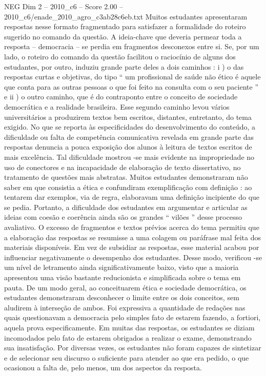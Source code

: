 \begin{textsample}{NEG Dim 2 – 2010\_c6 – Score 2.00 – 2010\_c6/enade\_2010\_agro\_c3ab28c6eb.txt}
Muitos estudantes apresentaram respostas nesse formato fragmentado para satisfazer a formalidade do roteiro sugerido no comando da questão.
A ideia-chave que deveria permear toda a resposta – democracia – se perdia em fragmentos desconexos entre si.
Se, por um lado, o roteiro do comando da questão facilitou o raciocínio de alguns dos estudantes, por outro, induziu grande parte deles a dois caminhos : i ) o das respostas curtas e objetivas, do tipo “ um profissional de saúde não ético é aquele que conta para as outras pessoas o que foi feito na consulta com o seu paciente ” e ii ) o outro caminho, que é do contraponto entre o conceito de sociedade democrática e a realidade brasileira.
Esse segundo caminho levou vários universitários a produzirem textos bem escritos, distantes, entretanto, do tema exigido.
No que se reporta às especificidades do desenvolvimento do conteúdo, a dificuldade ou falta de competência comunicativa revelada em grande parte das respostas denuncia a pouca exposição dos alunos à leitura de textos escritos de mais excelência.
Tal dificuldade mostrou -se mais evidente na impropriedade no uso de conectores e na incapacidade de elaboração de texto dissertativo, no tratamento de questões mais abstratas.
Muitos estudantes demonstraram não saber em que consistia a ética e confundiram exemplificação com definição : ao tentarem dar exemplos, via de regra, elaboravam uma definição incipiente do que se pedia.
Portanto, a dificuldade dos estudantes em argumentar e articular as ideias com coesão e coerência ainda são os grandes “ vilões ” desse processo avaliativo.
O excesso de fragmentos e textos prévios acerca do tema permitiu que a elaboração das respostas se resumisse a uma colagem ou paráfrase mal feita dos materiais disponíveis.
Em vez de subsidiar as respostas, esse material acabou por influenciar negativamente o desempenho dos estudantes.
Desse modo, verificou -se um nível de letramento ainda significativamente baixo, visto que a maioria apresentou uma visão bastante reducionista e simplificada sobre o tema em pauta.
De um modo geral, ao conceituarem ética e sociedade democrática, os estudantes demonstraram desconhecer o limite entre os dois conceitos, sem aludirem à interseção de ambos.
Foi expressiva a quantidade de redações nas quais questionavam a democracia pelo simples fato de estarem fazendo, a fortiori, aquela prova especificamente.
Em muitas das respostas, os estudantes se diziam incomodados pelo fato de estarem obrigados a realizar o exame, demonstrando sua insatisfação.
Por diversas vezes, os estudantes não foram capazes de sintetizar e de selecionar seu discurso o suficiente para atender ao que era pedido, o que ocasionou a falta de, pelo menos, um dos aspectos da resposta.

\end{textsample}
